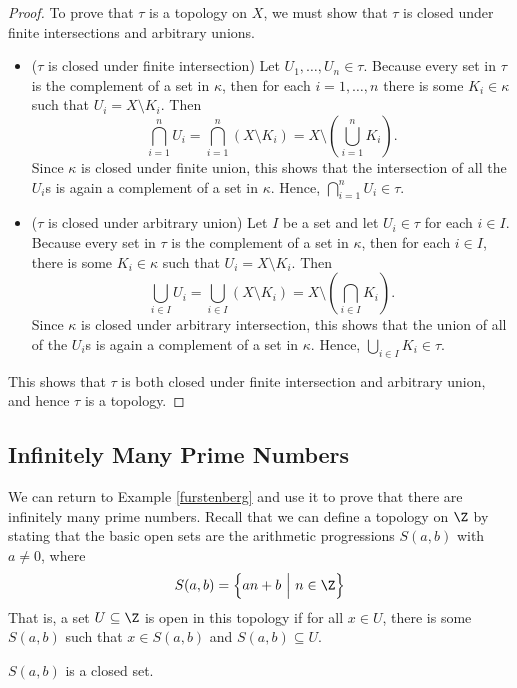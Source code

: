 \documentclass[noname]{notes}
\begin{document}
\begin{proof}
	To prove that $\tau$ is a topology on $X$, we must show that $\tau$ is closed under finite intersections and arbitrary unions. 
	\begin{itemize}
		\item ($\tau$ is closed under finite intersection) Let $U_1, \ldots, U_n \in \tau$. Because every set in $\tau$ is the complement of a set in $\kappa$, then for each $i = 1, \ldots, n$ there is some $K_i \in \kappa$ such that $U_i = X \setminus K_i$. Then 
		\[
			\bigcap_{i=1}^n U_i = \bigcap_{i=1}^n (X \setminus K_i) = X \setminus \left(\bigcup_{i=1}^n K_i\right). 
		\]
		Since $\kappa$ is closed under finite union, this shows that the intersection of all the $U_i$s is again a complement of a set in $\kappa$. Hence, $\bigcap_{i=1}^n U_i \in \tau$. 
		\item ($\tau$ is closed under arbitrary union) Let $I$ be a set and let $U_i \in \tau$ for each $i \in I$. Because every set in $\tau$ is the complement of a set in $\kappa$, then for each $i \in I$, there is some $K_i \in \kappa$ such that $U_i = X \setminus K_i$. Then 
		\[
			\bigcup_{i \in I} U_i = \bigcup_{i \in I} (X \setminus K_i) 
				= X \setminus \left( \bigcap_{i \in I} K_i \right).
		\]
		Since $\kappa$ is closed under arbitrary intersection, this shows that the union of all of the $U_i$s is again a complement of a set in $\kappa$. Hence, $\bigcup_{i \in I} K_i \in \tau$. 
	\end{itemize}
	This shows that $\tau$ is both closed under finite intersection and arbitrary union, and hence $\tau$ is a topology. 
\end{proof}

\subsection{Infinitely Many Prime Numbers}

We can return to Example \cref{furstenberg} and use it to prove that there are infinitely many prime numbers. Recall that we can define a topology on $\Z$ by stating that the basic open sets are the arithmetic progressions $S(a,b)$ with $a \neq 0$, where 
\[
	S(a, b) = \Big\{an + b \ \Big\vert\ n \in \Z \Big\} 
\]
That is, a set $U \subseteq \Z$ is open in this topology if for all $x \in U$, there is some $S(a,b)$ such that $x \in S(a,b)$ and $S(a,b) \subseteq U$. 

\begin{lemma}
	\label{basic opens are closed}
	$S(a,b)$ is a closed set. 
\end{lemma}
\end{document}

